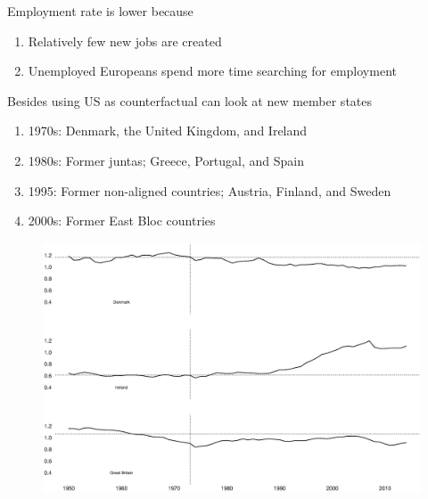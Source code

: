 \documentclass{beamer}
\begin{document}
\begin{frame}
  Employment rate is lower because
  \begin{enumerate}
    \item Relatively few new jobs are created
    \item Unemployed Europeans spend more time searching for employment  
  \end{enumerate}
\end{frame}

\begin{frame}
  Besides using US as counterfactual can look at new member states
  \begin{enumerate}
  \item 1970s: Denmark, the United Kingdom, and Ireland 
  \item 1980s: Former juntas; Greece, Portugal, and Spain
  \item 1995: Former non-aligned countries; Austria, Finland, and Sweden
  \item 2000s: Former East Bloc countries
\end{enumerate} 
\end{frame}

\begin{frame}
  \begin{figure}
    \includegraphics[scale=.3]{enlargement1.eps}
  \end{figure}
\end{frame}
\end{document}
